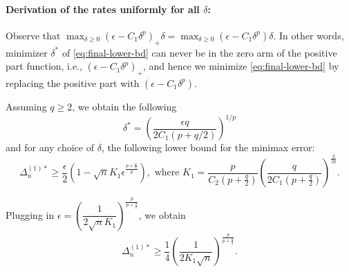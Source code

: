 % 
% 
% 

\paragraph{Derivation of the rates uniformly for all $\delta$:}
Observe that $\max_{\delta\ge 0} (\epsilon - C_1 \delta^p)_+ \delta = \max_{\delta\ge 0} (\epsilon - C_1 \delta^p) \delta$. 
In other words, minimizer $\delta^*$ of \eqref{eq:final-lower-bd} can never be in the zero arm of the positive part function, i.e., $(\epsilon - C_1 \delta^p)_+ $, and hence we minimize \eqref{eq:final-lower-bd} by replacing the positive part with $(\epsilon - C_1 \delta^p)$.

Assuming $q \ge 2$, we obtain the following 
\[
\delta^*=\left(\frac{\epsilon q}{2C_1(p+q/2)}\right)^{1/p}
\]
and for any choice of $\delta$, the following lower bound for the minimax error:
\[
\Delta_n^{(1)*} \ge \dfrac{\epsilon}{2} \left(1 - \sqrt{n}  K_1 \epsilon^{\frac{p+\tfrac{q}{2}}{p}}\right), \text{ where } K_1 = \dfrac{p}{C_2(p+\tfrac{q}{2})} \left(\dfrac{q}{2C_1(p+\tfrac{q}{2})}\right)^{\frac{q}{2p}}.
\]
 
Plugging in $\epsilon = \left(\dfrac{1}{2\sqrt{n} K_1} \right)^{\frac{p}{p+\frac{q}{2}}}$, we obtain
\begin{align}
\Delta_n^{(1)*} \ge \dfrac{1}{4}\left(\dfrac{1}{2 K_1 \sqrt n}\right)^{\frac{p}{p+\frac{q}{2}}}.
\label{eq:lb-pq}
\end{align}

